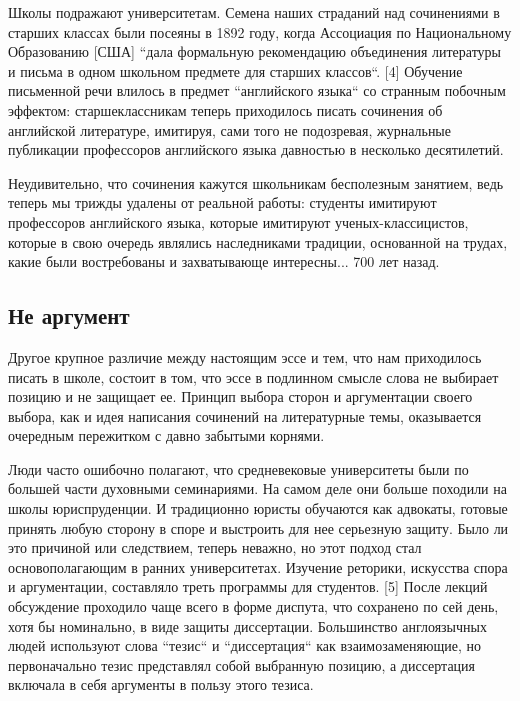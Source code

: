 \documentclass[ebook,12pt,oneside,openany]{memoir}
\begin{document}
Школы подражают университетам. Семена наших страданий над сочинениями
в старших классах были посеяны в 1892 году, когда Ассоциация по
Национальному Образованию [США] ``дала формальную рекомендацию
объединения литературы и письма в одном школьном предмете для старших
классов``. [4] Обучение письменной речи влилось в предмет
``английского языка`` со странным побочным эффектом: старшеклассникам
теперь приходилось писать сочинения об английской литературе,
имитируя, сами того не подозревая, журнальные публикации профессоров
английского языка давностью в несколько десятилетий. \newline

Неудивительно, что сочинения кажутся школьникам бесполезным занятием,
ведь теперь мы трижды удалены от реальной работы: студенты имитируют
профессоров английского языка, которые имитируют ученых-классицистов,
которые в свою очередь являлись наследниками традиции, основанной на
трудах, какие были востребованы и захватывающе интересны... 700 лет
назад.

\subsection{Не аргумент}

Другое крупное различие между настоящим эссе и тем, что нам
приходилось писать в школе, состоит в том, что эссе в подлинном смысле
слова не выбирает позицию и не защищает ее. Принцип выбора сторон и
аргументации своего выбора, как и идея написания сочинений на
литературные темы, оказывается очередным пережитком с давно забытыми
корнями. \newline

Люди часто ошибочно полагают, что средневековые университеты были по
большей части духовными семинариями. На самом деле они больше походили
на школы юриспруденции. И традиционно юристы обучаются как адвокаты,
готовые принять любую сторону в споре и выстроить для нее серьезную
защиту. Было ли это причиной или следствием, теперь неважно, но этот
подход стал основополагающим в ранних университетах. Изучение
реторики, искусства спора и аргументации, составляло треть программы
для студентов. [5] После лекций обсуждение проходило чаще всего в
форме диспута, что сохранено по сей день, хотя бы номинально, в виде
защиты диссертации. Большинство англоязычных людей используют слова
``тезис`` и ``диссертация`` как взаимозаменяющие, но первоначально
тезис представлял собой выбранную позицию, а диссертация включала в
себя аргументы в пользу этого тезиса. \newline
\end{document}
